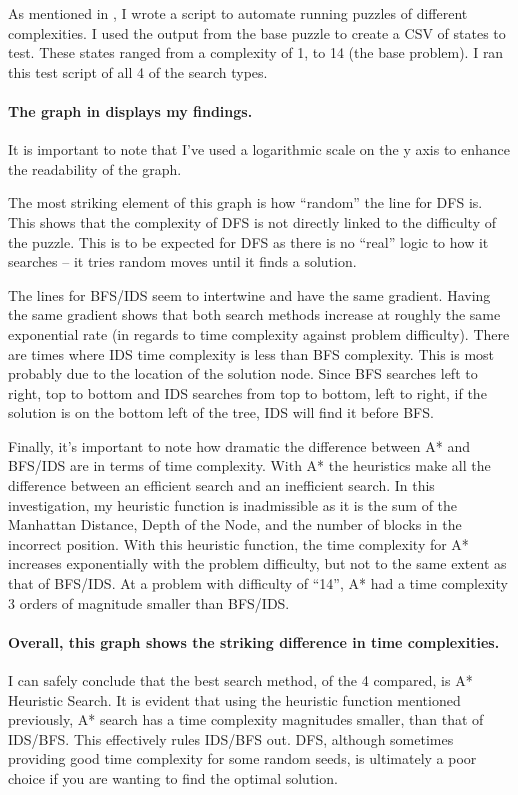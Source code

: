 \documentclass[a4paper]{article}
\begin{document}
As mentioned in , I wrote a script to automate running puzzles of different complexities.
I used the output from the base puzzle to create a CSV of states to test.
These states ranged from a complexity of 1, to 14 (the base problem).
I ran this test script of all 4 of the search types.

\paragraph{The graph in  displays my findings.}
It is important to note that I've used a logarithmic scale on the y axis to enhance the readability of the graph.

The most striking element of this graph is how ``random'' the line for DFS is.
This shows that the complexity of DFS is not directly linked to the difficulty of the puzzle.
This is to be expected for DFS as there is no ``real'' logic to how it searches -- it tries random moves until it finds a solution.

The lines for BFS/IDS seem to intertwine and have the same gradient.
Having the same gradient shows that both search methods increase at roughly the same exponential rate (in regards to time complexity against problem difficulty).
There are times where IDS time complexity is less than BFS complexity.
This is most probably due to the location of the solution node.
Since BFS searches left to right, top to bottom and IDS searches from top to bottom, left to right, if the solution is on the bottom left of the tree, IDS will find it before BFS.

Finally, it's important to note how dramatic the difference between A* and BFS/IDS are in terms of time complexity.
With A* the heuristics make all the difference between an efficient search and an inefficient search.
In this investigation, my heuristic function is inadmissible as it is the sum of the Manhattan Distance, Depth of the Node, and the number of blocks in the incorrect position.
With this heuristic function, the time complexity for A* increases exponentially with the problem difficulty, but not to the same extent as that of BFS/IDS.
At a problem with difficulty of ``14'', A* had a time complexity 3 orders of magnitude smaller than BFS/IDS.

\paragraph{Overall, this graph shows the striking difference in time complexities.}
I can safely conclude that the best search method, of the 4 compared, is A* Heuristic Search.
It is evident that using the heuristic function mentioned previously, A* search has a time complexity magnitudes smaller, than that of IDS/BFS.
This effectively rules IDS/BFS out.
DFS, although sometimes providing good time complexity for some random seeds, is ultimately a poor choice if you are wanting to find the optimal solution.
\end{document}
